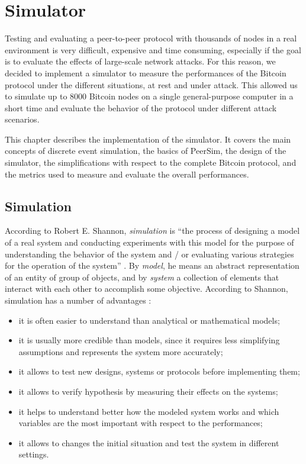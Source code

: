 \chapter{Simulator}
\label{chapter:simulator}

Testing and evaluating a peer-to-peer protocol with thousands of nodes in a real environment is very difficult, expensive and time consuming, especially if the goal is to evaluate the effects of large-scale network attacks.
For this reason, we decided to implement a simulator to measure the performances of the Bitcoin protocol under the different situations, at rest and under attack.
This allowed us to simulate up to \num{8000} Bitcoin nodes on a single general-purpose computer in a short time and evaluate the behavior of the protocol under different attack scenarios.

\medskip
This chapter describes the implementation of the simulator.
It covers the main concepts of discrete event simulation, the basics of PeerSim, the design of the simulator, the simplifications with respect to the complete Bitcoin protocol, and the metrics used to measure and evaluate the overall performances.


\section{Simulation}
According to Robert E. Shannon, \textit{simulation} is ``the process of designing a model of a real system and conducting experiments with this model for the purpose of understanding the behavior of the system and / or evaluating various strategies for the operation of the system'' \cite{simulation_shannon_1998}.
By \textit{model}, he means an abstract representation of an entity of group of objects, and by \textit{system} a collection of elements that interact with each other to accomplish some objective.
According to Shannon, simulation has a number of advantages \cite{simulation_shannon_1998}:
\begin{itemize}
	\item it is often easier to understand than analytical or mathematical models;
	\item it is usually more credible than models, since it requires less simplifying assumptions and represents the system more accurately;
	\item it allows to test new designs, systems or protocols before implementing them;
	\item it allows to verify hypothesis by measuring their effects on the systems;
	\item it helps to understand better how the modeled system works and which variables are the most important with respect to the performances;
	\item it allows to changes the initial situation and test the system in different settings.
\end{itemize}

